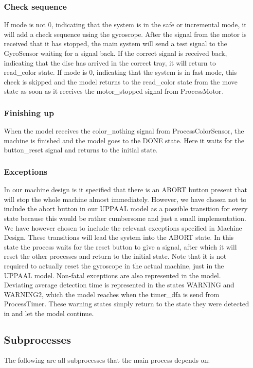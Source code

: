 \documentclass[a4paper,oneside,11pt]{article}
\begin{document}
\subsubsection{Check sequence}
If mode is not 0, indicating that the system is in the safe or incremental mode, it will add a check sequence using the gyroscope. After the signal from the motor is received that it has stopped, the main system will send a test signal to the GyroSensor waiting for a signal back. If the correct signal is received back, indicating that the disc has arrived in the correct tray, it will return to read\_color state. If mode is 0, indicating that the system is in fast mode, this check is skipped and the model returns to the read\_color state from the move state as soon as it receives the motor\_stopped signal from ProcessMotor.

\subsubsection{Finishing up}
When the model receives the color\_nothing signal from ProcessColorSensor, the machine is finished and the model goes to the DONE state. Here it waits for the button\_reset signal and returns to the initial state.

\subsubsection{Exceptions}
In our machine design is it specified that there is an ABORT button present that will stop the whole machine almost immediately. However, we have chosen not to include the abort button in our UPPAAL model as a possible transition for every state because this would be rather cumbersome and just a small implementation. We have however chosen to include the relevant exceptions specified in Machine Design. These transitions will lead the system into the ABORT state. In this state the process waits for the reset button to give a signal, after which it will reset the other processes and return to the initial state. Note that it is not required to actually reset the gyroscope in the actual machine, just in the UPPAAL model. Non-fatal exceptions are also represented in the model. Deviating average detection time is represented in the states WARNING and WARNING2, which the model reaches when the timer\_dfa is send from ProcessTimer. These warning states simply return to the state they were detected in and let the model continue.

\subsection{Subprocesses}
The following are all subprocesses that the main process depends on:
\end{document}
